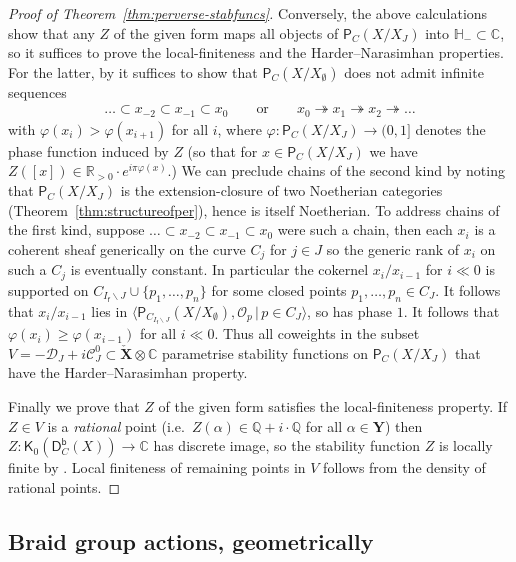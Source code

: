 \documentclass[reqno,a4paper]{amsart}
\newcommand{\calC}{\mathcal{C}}
\newcommand{\calD}{\mathcal{D}}
\newcommand{\C}{\mathbb{C}}
\newcommand{\HH}{\mathbb{H}}
\newcommand{\Q}{\mathbb{Q}}
\newcommand{\scrO}{\mathscr{O}}
\newcommand{\sfK}{\mathsf{K}}
\newcommand{\sff}{\mathsf{f}}
\newcommand{\bfY}{\mathbf{Y}}
\newcommand{\bfX}{\mathbf{X}}
\newcommand{\catP}{\mathsf{P}}
\newcommand{\catPC}{\mathsf{P}_{C}}
\newcommand{\catDbC}{\mathsf{D}^\mathsf{b}_C}
\newcommand{\rootlattice}{\bfY}
\newcommand{\weightlattice}{\bfX}
\newcommand{\coweightlattice}{\check{\weightlattice}}
\newcommand{\rsv}{X}
\newcommand{\ssv}{X_\emptyset}
\newcommand{\psv}{X_J}
\theoremstyle{basic-theorem}
\numberwithin{equation}{section}
\begin{document}
\begin{proof}[Proof of Theorem~\ref{thm:perverse-stabfuncs}]
    Conversely, the above calculations show that any $Z$ of the given form maps all objects of $\catPC(\rsv/\psv)$ into $\HH_-\subset\C$, so it suffices to prove the local-finiteness and the Harder--Narasimhan properties. For the latter, by \cite[Proposition~2.4]{B07} it suffices to show that $\catPC(\rsv/\ssv)$ does not admit infinite sequences
	\begin{align}
		\ldots\subset x_{-2}\subset x_{-1}\subset x_0 \qquad \text{or}\qquad x_0\twoheadrightarrow x_1\twoheadrightarrow x_2\twoheadrightarrow \ldots
	\end{align}
    with $\varphi(x_{i})>\varphi(x_{i+1})$ for all $i$, where $\varphi\colon \catPC(\rsv/\psv)\to (0,1]$ denotes the phase function induced by $Z$ (so that for $x\in \catPC(\rsv/\psv)$ we have $Z([x])\in \mathbb{R}_{>0}\cdot e^{i\pi\varphi(x)}$.) We can preclude chains of the second kind by noting that $\catPC(\rsv/\psv)$ is the extension-closure of two Noetherian categories (Theorem~\ref{thm:structureofper}), hence is itself Noetherian. To address chains of the first kind, suppose $\ldots\subset x_{-2}\subset x_{-1}\subset x_0$ were such a chain, then each $x_i$ is a coherent sheaf generically on the curve $C_j$ for $j\in J$ so the generic rank of $x_i$ on such a $C_j$ is eventually constant. In particular the cokernel $x_i/x_{i-1}$ for $i\ll 0$ is supported on $C_{I_\sff\smallsetminus J}\cup\{p_1,\ldots,p_n\}$ for some closed points $p_1,\ldots,p_n\in C_J$. It follows that $x_i/x_{i-1}$ lies in $\langle \catP_{C_{I_\sff\smallsetminus J}}(\rsv/\ssv), \scrO_p\,\vert\, p\in C_J\rangle$, so has phase $1$. It follows that $\varphi(x_i)\geq \varphi(x_{i-1})$ for all $i\ll 0$. Thus all coweights in the subset $V=-\calD_J+i\calC_J^0\subset \coweightlattice\otimes \C$ parametrise stability functions on $\catPC(\rsv/\psv)$ that have the Harder--Narasimhan property.

	Finally we prove that $Z$ of the given form satisfies the local-finiteness property. If $Z\in V$ is a \textit{rational} point (i.e.\ $Z(\alpha)\in \Q+i\cdot \Q$ for all $\alpha\in \rootlattice$) then $Z\colon \sfK_0(\catDbC(\rsv))\to \C$ has discrete image, so the stability function $Z$ is locally finite by \cite[Lemma~4.4]{bridgelandStabilityConditionsK3}. Local finiteness of remaining points in $V$ follows from the density of rational points.
\end{proof}

\subsection{Braid group actions, geometrically}
\label{subsec:geometricbraidgroup}
\end{document}
